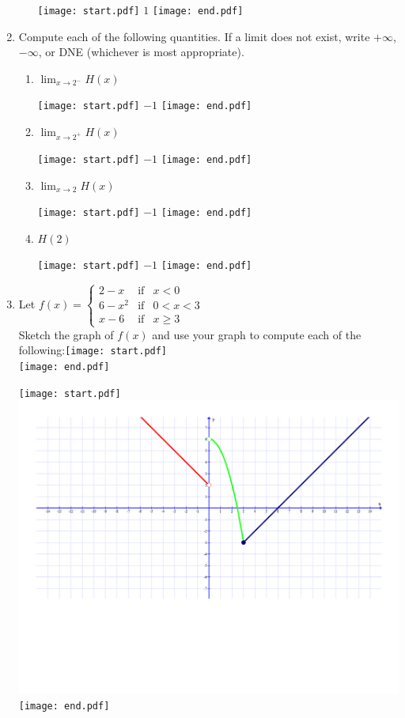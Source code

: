 \documentclass[12pt]{article}
\begin{document}
\begin{enumerate}
\begin{enumerate}
\texttt{[image: start.pdf]}
{{$1$}}
\texttt{[image: end.pdf]}


\end{enumerate}

\item Compute each of the following quantities.  If a limit does not exist, write $+\infty$, $-\infty$, or DNE (whichever is most appropriate). 

\begin{enumerate}

\item $\displaystyle \lim_{x \rightarrow 2^{-}}{H(x)}$

\texttt{[image: start.pdf]}
{{$-1$}}
\texttt{[image: end.pdf]}


\item $\displaystyle \lim_{x \rightarrow 2^{+}}{H(x)}$

\texttt{[image: start.pdf]}
{{$-1$}}
\texttt{[image: end.pdf]}


\item $\displaystyle \lim_{x \rightarrow 2}{H(x)}$

\texttt{[image: start.pdf]}
{{$-1$}}
\texttt{[image: end.pdf]}


\item $H(2)$

\texttt{[image: start.pdf]}
{{$-1$}}
\texttt{[image: end.pdf]}


\end{enumerate}

\newpage

\item Let $\displaystyle f(x)=\left\{ 
\begin{array}{lll}
2-x & \text{if} & x < 0\\
6-x^2& \text{if} & 0<x<3 \\
x-6 & \text{if} & x \geq 3
\end{array}\right.$\\
Sketch the graph of $f(x)$ and use your graph to compute each of the following:\texttt{[image: start.pdf]}
{\\}
\texttt{[image: end.pdf]}


\texttt{[image: start.pdf]}
{{\includegraphics[scale=0.5]{graph.pdf}}}
\texttt{[image: end.pdf]}



\end{enumerate}
\end{document}
